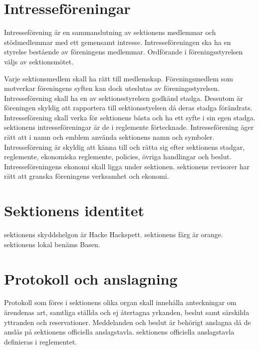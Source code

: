 \documentclass[a4paper]{dtek}
\begin{document}
\section{Intresseföreningar}
\para[Definition]
Intresseförening är en sammanslutning av sektionens medlemmar och stödmedlemmar med ett gemensamt intresse. Intresseföreningen ska ha en styrelse bestående av föreningens medlemmar. Ordförande i föreningsstyrelsen väljs av sektionsmötet.

\para Varje sektionsmedlem skall ha rätt till medlemskap. Föreningsmedlem som motverkar föreningens syften kan dock uteslutas av föreningsstyrelsen.
\para[Syfte] Intresseförening skall ha en av sektionsstyrelsen godkänd stadga. Dessutom är föreningen skyldig att rapportera till sektionsstyelsen då deras stadga förändrats.
\para Intresseförening skall verka för sektionens bästa och ha ett syfte i sin egen stadga.
\para sektionens intresseföreningar är de i reglemente förtecknade.
\para[Rättigheter]Intresseförening äger rätt att i namn och emblem använda sektionens namn och symboler.
\para[Skyldigheter] Intresseförening är skyldig att känna till och rätta sig efter sektionens stadgar, reglemente, ekonomiska reglemente, policies, övriga handlingar och beslut.
\para[Ekonomi] Intresseföreningens ekonomi skall ligga under sektionen.
\para sektionens revisorer har rätt att granska föreningens verksamhet och ekonomi. 

\section{Sektionens identitet}
\para[Skyddshelgon] sektionens skyddshelgon är Hacke Hackspett.
\para[Sektionsfärg] sektionens färg är orange.
\para[Sektionslokal] sektionens lokal benäms Basen.

\section{Protokoll och anslagning}
\para[Allmänt] Protokoll som föres i sektionens olika organ skall innehålla anteckningar om ärendenas art, samtliga ställda och ej återtagna yrkanden, beslut samt särskilda yttranden och reservationer.
\para[Anslagning] Meddelanden och beslut är behörigt anslagna då de anslås på sektionens officiella anslagstavla. sektionens officiella anslagstavla definieras i reglementet.
\end{document}
